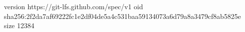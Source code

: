 version https://git-lfs.github.com/spec/v1
oid sha256:2f2da7af69222fc1e2df04de5a4c531baa59134073a6d79a8a3479cf8ab5825e
size 12384
